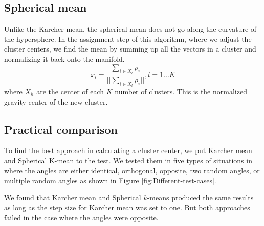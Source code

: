 \documentclass[../tech_report_1.tex]{subfiles}
\begin{document}
\subsection{Spherical mean}

Unlike the Karcher mean, the spherical mean does not go along the
curvature of the hypersphere. In the assignment step of this algorithm,
where we adjust the cluster centers, we find the mean by summing up
all the vectors in a cluster and normalizing it back onto the manifold.
\[
x_{l}=\frac{\sum_{i\in X_{l}}\rho_{i}}{||\sum_{i\in X_{l}}\rho_{i}||},l=1\dots K
\]
 where $X_{h}$ are the center of each $K$ number of clusters. This
is the normalized gravity center of the new cluster. 


\subsection{Practical comparison}

To find the best approach in calculating a cluster center, we put
Karcher mean and Spherical K-mean to the test. We tested them in five
types of situations in where the angles are either identical, orthogonal,
opposite, two random angles, or multiple random angles as shown in
Figure \ref{fig:Different-test-cases}. 

We found that Karcher mean and Spherical $k$-means produced the same
results as long as the step size for Karcher mean was set to one.
But both approaches failed in the case where the angles were opposite. 

\end{document}
